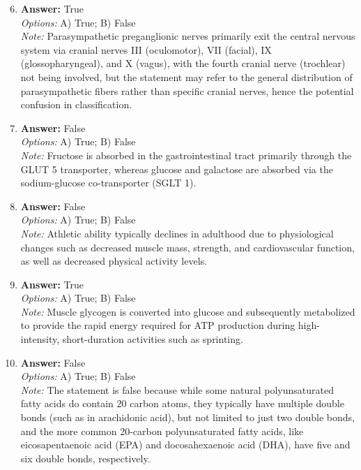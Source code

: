 \documentclass[12pt]{article}
\begin{document}
\begin{enumerate}[label=\arabic*.]
\setcounter{enumi}{5}
\item \textbf{Answer:} True
\\ \textit{Options:} A) True; B) False
\\ \textit{Note:} Parasympathetic preganglionic nerves primarily exit the central nervous system via cranial nerves III (oculomotor), VII (facial), IX (glossopharyngeal), and X (vagus), with the fourth cranial nerve (trochlear) not being involved, but the statement may refer to the general distribution of parasympathetic fibers rather than specific cranial nerves, hence the potential confusion in classification.
\item \textbf{Answer:} False
\\ \textit{Options:} A) True; B) False
\\ \textit{Note:} Fructose is absorbed in the gastrointestinal tract primarily through the GLUT 5 transporter, whereas glucose and galactose are absorbed via the sodium-glucose co-transporter (SGLT 1).
\item \textbf{Answer:} False
\\ \textit{Options:} A) True; B) False
\\ \textit{Note:} Athletic ability typically declines in adulthood due to physiological changes such as decreased muscle mass, strength, and cardiovascular function, as well as decreased physical activity levels.
\item \textbf{Answer:} True
\\ \textit{Options:} A) True; B) False
\\ \textit{Note:} Muscle glycogen is converted into glucose and subsequently metabolized to provide the rapid energy required for ATP production during high-intensity, short-duration activities such as sprinting.
\item \textbf{Answer:} False
\\ \textit{Options:} A) True; B) False
\\ \textit{Note:} The statement is false because while some natural polyunsaturated fatty acids do contain 20 carbon atoms, they typically have multiple double bonds (such as in arachidonic acid), but not limited to just two double bonds, and the more common 20-carbon polyunsaturated fatty acids, like eicosapentaenoic acid (EPA) and docosahexaenoic acid (DHA), have five and six double bonds, respectively.
\end{enumerate}
\end{document}
